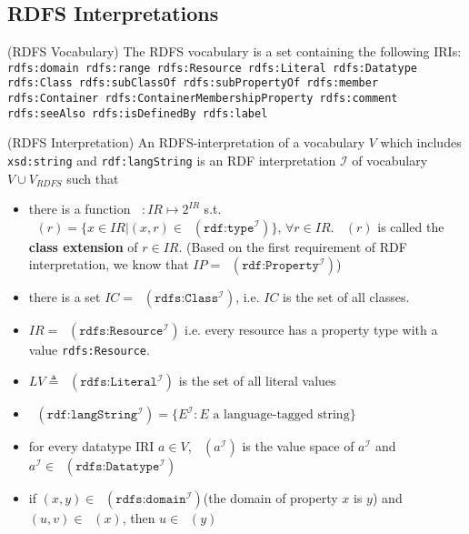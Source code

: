 \documentclass{article}
\DeclareMathOperator{\IEXT}{I_{EXT}}
\DeclareMathOperator{\ICEXT}{I_{CEXT}}
\newcommand{\deno}[1]{{\texttt{#1}}^{\mathcal{I}}}
\begin{document}
\newpage 
\subsection{RDFS Interpretations}
\begin{defin}(RDFS Vocabulary)
The RDFS vocabulary is a set containing the following IRIs:\newline
\texttt{rdfs:domain rdfs:range rdfs:Resource rdfs:Literal rdfs:Datatype rdfs:Class rdfs:subClassOf rdfs:subPropertyOf rdfs:member rdfs:Container rdfs:ContainerMembershipProperty rdfs:comment rdfs:seeAlso rdfs:isDefinedBy rdfs:label}
\end{defin}



\begin{defin}(RDFS Interpretation)\newline
An RDFS-interpretation of a vocabulary $V$ which includes \texttt{xsd:string} and \texttt{rdf:langString} is an RDF interpretation $\mathcal{I}$ of vocabulary $V \cup V_{RDFS}$ such that 
\begin{itemize}
\item there is a function $\ICEXT:IR \mapsto 2^{IR}$ s.t. $\ICEXT(r) = \{x \in IR | (x,r) \in \IEXT(\texttt{rdf:type}^{\mathcal{I}})\},\,\forall r \in IR$. $\ICEXT(r)$ is called the \textbf{class extension} of $r \in IR$. (Based on the first requirement of RDF interpretation, we know that $IP = \ICEXT(\deno{rdf:Property})$)

\item there is a set $IC = \ICEXT(\texttt{rdfs:Class}^{\mathcal{I}})$, i.e. $IC$ is the set of all classes. 

\item $IR = \ICEXT(\texttt{rdfs:Resource}^{\mathcal{I}})$ i.e. every resource has a property type with a value \texttt{rdfs:Resource}.
\item $LV \triangleq \ICEXT(\texttt{rdfs:Literal}^{\mathcal{I}})$ is the set of all literal values
\item $\ICEXT(\texttt{rdf:langString}^{\mathcal{I}}) =  \{E^{\mathcal{I}} : E \text{ a language-tagged string} \}$

\item for every datatype IRI $a\in V$, $\ICEXT(a^{\mathcal{I}})$ is the value space of $a^{\mathcal{I}}$ and $a^{\mathcal{I}} \in \ICEXT(\texttt{rdfs:Datatype}^{\mathcal{I}})$

\item if $(x,y) \in \IEXT(\deno{rdfs:domain})$(the domain of property $x$ is $y$) and $(u,v) \in \IEXT(x)$, then $u \in \ICEXT(y)$


\end{itemize}
\end{defin}
\end{document}
